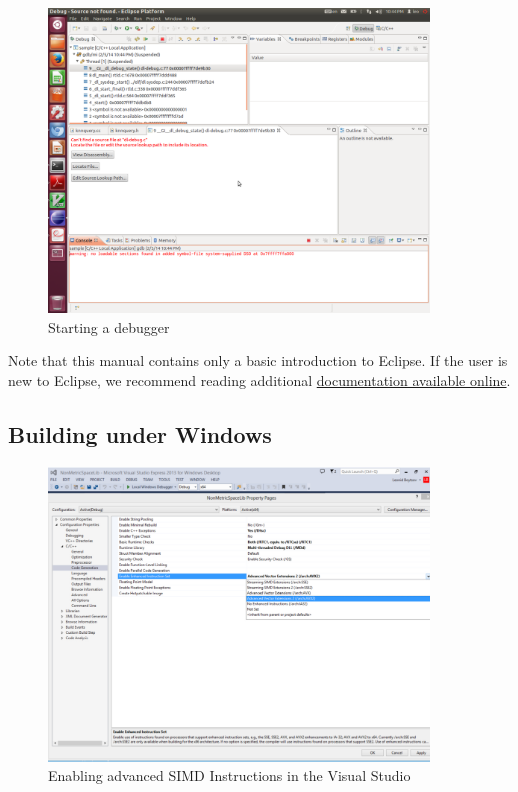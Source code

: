 \documentclass[runningheads,a4paper]{llncs}
\begin{document}
{\begin{figure}
\centering
\caption{\label{FigDebug}Starting a debugger}
\includegraphics[width=0.9\textwidth]{figures/EclipseDebug.pdf}
\end{figure}


Note that this manual contains only a basic introduction to Eclipse.
If the user is new to Eclipse, we recommend reading
additional \href{http://www.eclipse.org/ide/}{documentation available online}.


\subsection{Building under Windows}\label{SectionBuildWindows}

\begin{figure}
\centering
\caption{\label{FigAVXSet}Enabling advanced SIMD Instructions in the Visual Studio}
\includegraphics[width=0.9\textwidth]{figures/SettingAVXinVS2012.pdf}
\end{figure}

}
\end{document}
